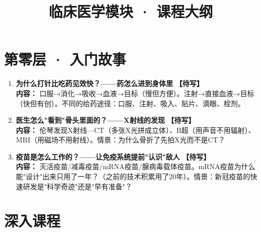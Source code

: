 \documentclass[a4paper,11pt]{ctexart}
\title{\textcolor{blue!70!black}{\Huge\textbf{临床医学模块 · 课程大纲}}}
\author{}
\date{}
\newcommand{\draft}{\textcolor{orange!80!black}{\textbf{【待写】}}}
\begin{document}
\maketitle
\thispagestyle{empty}

\section*{第零层 · 入门故事}

\begin{enumerate}
\item[\textbf{第1课}] \textbf{为什么打针比吃药见效快？——药怎么进到身体里} \draft \\
\textbf{内容：} 口服→消化→吸收→血液→目标（慢但方便）。注射→直接血液→目标（快但有创）。不同的给药途径：口服、注射、吸入、贴片、滴眼、栓剂。
\item[\textbf{第2课}] \textbf{医生怎么"看到"骨头里面的？——X射线的发现} \draft \\
\textbf{内容：} 伦琴发现X射线—CT（多张X光拼成立体）、B超（用声音不用辐射）、MRI（用磁场不用射线）。情景：为什么骨折了先拍X光而不是CT？
\item[\textbf{第3课}] \textbf{疫苗是怎么工作的？——让免疫系统提前"认识"敌人} \draft \\
\textbf{内容：} 灭活疫苗/减毒疫苗/mRNA疫苗/腺病毒载体疫苗。mRNA疫苗为什么能"设计"出来只用了一年？（之前的技术积累用了20年）。情景：新冠疫苗的快速研发是"科学奇迹"还是"早有准备"？
\end{enumerate}

\section*{深入课程}
\end{document}
